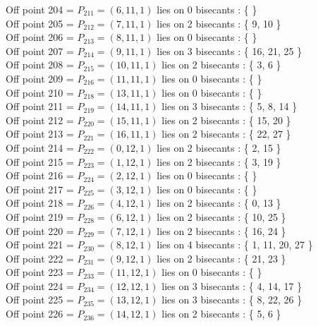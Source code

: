 \documentclass{article}
\begin{document}
{Off point 204 = $P_{211} = ( 6, 11, 1 )$ lies on 0 bisecants : \{  \}\\
Off point 205 = $P_{212} = ( 7, 11, 1 )$ lies on 2 bisecants : \{ 9, 10 \}\\
Off point 206 = $P_{213} = ( 8, 11, 1 )$ lies on 0 bisecants : \{  \}\\
Off point 207 = $P_{214} = ( 9, 11, 1 )$ lies on 3 bisecants : \{ 16, 21, 25 \}\\
Off point 208 = $P_{215} = ( 10, 11, 1 )$ lies on 2 bisecants : \{ 3, 6 \}\\
Off point 209 = $P_{216} = ( 11, 11, 1 )$ lies on 0 bisecants : \{  \}\\
Off point 210 = $P_{218} = ( 13, 11, 1 )$ lies on 0 bisecants : \{  \}\\
Off point 211 = $P_{219} = ( 14, 11, 1 )$ lies on 3 bisecants : \{ 5, 8, 14 \}\\
Off point 212 = $P_{220} = ( 15, 11, 1 )$ lies on 2 bisecants : \{ 15, 20 \}\\
Off point 213 = $P_{221} = ( 16, 11, 1 )$ lies on 2 bisecants : \{ 22, 27 \}\\
Off point 214 = $P_{222} = ( 0, 12, 1 )$ lies on 2 bisecants : \{ 2, 15 \}\\
Off point 215 = $P_{223} = ( 1, 12, 1 )$ lies on 2 bisecants : \{ 3, 19 \}\\
Off point 216 = $P_{224} = ( 2, 12, 1 )$ lies on 0 bisecants : \{  \}\\
Off point 217 = $P_{225} = ( 3, 12, 1 )$ lies on 0 bisecants : \{  \}\\
Off point 218 = $P_{226} = ( 4, 12, 1 )$ lies on 2 bisecants : \{ 0, 13 \}\\
Off point 219 = $P_{228} = ( 6, 12, 1 )$ lies on 2 bisecants : \{ 10, 25 \}\\
Off point 220 = $P_{229} = ( 7, 12, 1 )$ lies on 2 bisecants : \{ 16, 24 \}\\
Off point 221 = $P_{230} = ( 8, 12, 1 )$ lies on 4 bisecants : \{ 1, 11, 20, 27 \}\\
Off point 222 = $P_{231} = ( 9, 12, 1 )$ lies on 2 bisecants : \{ 21, 23 \}\\
Off point 223 = $P_{233} = ( 11, 12, 1 )$ lies on 0 bisecants : \{  \}\\
Off point 224 = $P_{234} = ( 12, 12, 1 )$ lies on 3 bisecants : \{ 4, 14, 17 \}\\
Off point 225 = $P_{235} = ( 13, 12, 1 )$ lies on 3 bisecants : \{ 8, 22, 26 \}\\
Off point 226 = $P_{236} = ( 14, 12, 1 )$ lies on 2 bisecants : \{ 5, 6 \}\\
}
\end{document}

